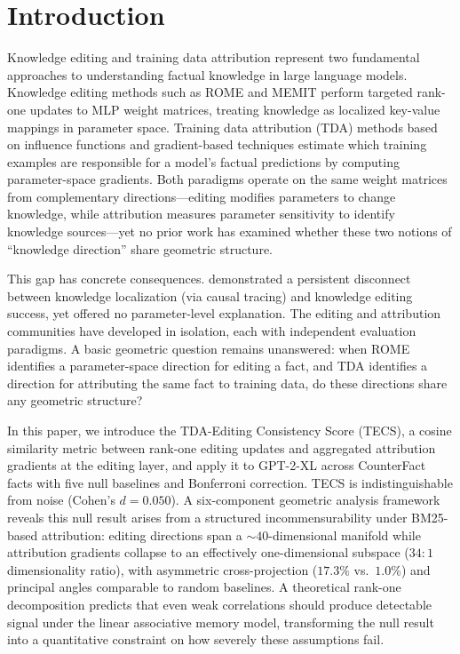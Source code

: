 \section{Introduction}
\label{sec:introduction}

Knowledge editing and training data attribution represent two fundamental approaches to understanding factual knowledge in large language models.
Knowledge editing methods such as ROME \citep{meng2022locating} and MEMIT \citep{meng2022mass} perform targeted rank-one updates to MLP weight matrices, treating knowledge as localized key-value mappings in parameter space.
Training data attribution (TDA) methods based on influence functions \citep{koh2017understanding} and gradient-based techniques \citep{park2023trak} estimate which training examples are responsible for a model's factual predictions by computing parameter-space gradients.
Both paradigms operate on the same weight matrices from complementary directions---editing modifies parameters to change knowledge, while attribution measures parameter sensitivity to identify knowledge sources---yet no prior work has examined whether these two notions of ``knowledge direction'' share geometric structure.

This gap has concrete consequences.
\citet{hase2023does} demonstrated a persistent disconnect between knowledge localization (via causal tracing) and knowledge editing success, yet offered no parameter-level explanation.
The editing and attribution communities have developed in isolation, each with independent evaluation paradigms.
A basic geometric question remains unanswered: when ROME identifies a parameter-space direction for editing a fact, and TDA identifies a direction for attributing the same fact to training data, do these directions share any geometric structure?

In this paper, we introduce the TDA-Editing Consistency Score (TECS), a cosine similarity metric between rank-one editing updates and aggregated attribution gradients at the editing layer, and apply it to GPT-2-XL across CounterFact facts with five null baselines and Bonferroni correction.
TECS is indistinguishable from noise (Cohen's $d = 0.050$).
A six-component geometric analysis framework reveals this null result arises from a structured incommensurability under BM25-based attribution: editing directions span a ${\sim}40$-dimensional manifold while attribution gradients collapse to an effectively one-dimensional subspace ($34{:}1$ dimensionality ratio), with asymmetric cross-projection ($17.3\%$ vs.\ $1.0\%$) and principal angles comparable to random baselines.
A theoretical rank-one decomposition predicts that even weak correlations should produce detectable signal under the linear associative memory model, transforming the null result into a quantitative constraint on how severely these assumptions fail.

